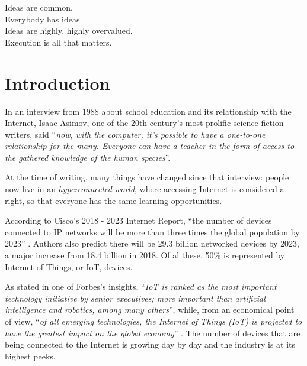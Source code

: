 
\begin{savequote}[65mm]
	 Ideas are common.\\
	 Everybody has ideas.\\
	 Ideas are highly, highly overvalued.\\
	 Execution is all that matters.
\end{savequote}

\chapter{Introduction}\label{chapter:introduction}

	
	In an interview from 1988 about school education and its relationship with the Internet, Isaac Asimov, one of the 20th century's most prolific science fiction writers, said ``\textit{now, with the computer, it's possible to have a one-to-one relationship for the many. Everyone can have a teacher in the form of access to the gathered knowledge of the human species}''.
	
	At the time of writing, many things have changed since that interview: people now live in an \textit{hyperconnected world}, where accessing Internet is considered a right, so that everyone has the same learning opportunities.
	
	According to Cisco's 2018 - 2023 Internet Report, ``the number of devices connected to IP networks will be more than three times the global population by 2023'' \cite{cisco1}.
	Authors also predict there will be 29.3 billion networked devices by 2023, a major increase from 18.4 billion in 2018. 
	Of al these, 50\% is represented by Internet of Things, or IoT, devices.
	
	As stated in one of Forbes's insights, ``\textit{IoT is ranked as the most important technology initiative by senior executives; more important than artificial intelligence and robotics, among many others}'', while, from an economical point of view, ``\textit{of all emerging technologies, the Internet of Things (IoT) is projected to have the greatest impact on the global economy}'' \cite{forbes}.
	The number of devices that are being connected to the Internet is growing day by day and the industry is at its highest peeks.
	
